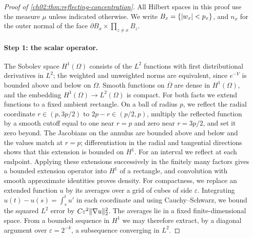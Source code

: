 \begin{proof}[Proof of \cref{ch02:thm:reflecting-concentration}]
All Hilbert spaces in this proof use the measure $\mu$ unless indicated otherwise. We write $B_x=\{\lvert w_x\rvert<p_x\}$, and $n_x$ for the outer normal of the face $\partial B_x\times\prod_{z\ne x}B_z$.

\paragraph{Step 1: the scalar operator.} The Sobolev space $H^1(\Omega)$ consists of the $L^2$ functions with first distributional derivatives in $L^2$; the weighted and unweighted norms are equivalent, since $e^{-V}$ is bounded above and below on $\Omega$. Smooth functions on $\overline\Omega$ are dense in $H^1(\Omega)$, and the embedding $H^1(\Omega)\to L^2(\Omega)$ is compact. For both facts we extend functions to a fixed ambient rectangle. On a ball of radius $p$, we reflect the radial coordinate $r\in(p,3p/2)$ to $2p-r\in(p/2,p)$, multiply the reflected function by a smooth cutoff equal to one near $r=p$ and zero near $r=3p/2$, and set it zero beyond. The Jacobians on the annulus are bounded above and below and the values match at $r=p$; differentiation in the radial and tangential directions shows that this extension is bounded on $H^1$. For an interval we reflect at each endpoint. Applying these extensions successively in the finitely many factors gives a bounded extension operator into $H^1$ of a rectangle, and convolution with smooth approximate identities proves density. For compactness, we replace an extended function $u$ by its averages over a grid of cubes of side $\varepsilon$. Integrating $u(t)-u(s)=\int_s^tu'$ in each coordinate and using Cauchy--Schwarz, we bound the squared $L^2$ error by $C\varepsilon^2\lVert \nabla u\rVert_2^2$. The averages lie in a fixed finite-dimensional space. From a bounded sequence in $H^1$ we may therefore extract, by a diagonal argument over $\varepsilon=2^{-k}$, a subsequence converging in $L^2$.


\end{proof}
